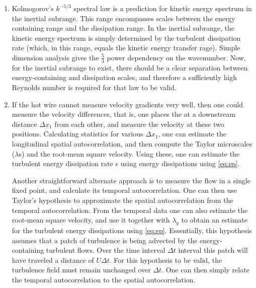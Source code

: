 \documentclass[11pt]{article}
\begin{document}
\begin{enumerate}[label=(\alph*)]

        \item Kolmogorov's $k^{-5/3}$ spectral law is a prediction for kinetic energy spectrum in the inertial
             subrange. This range encompasses scales between the energy containing range and the 
              dissipation range. In the inertial subrange, the kinetic energy spectrum is simply determined by the
               turbulent dissipation rate (which, in this range, equals the kinetic energy transfer rage). Simple dimension analysis
                gives the $\tfrac{5}{3}$ power dependency on the wavenumber. Now, for the inertial subrange to exist, 
                 there should be a clear separation between energy-containing and dissipation scales, and therefore
                  a sufficiently high Reynolds number is required for that law to be valid.
              \item If the hot wire cannot measure velocity gradients very well, then one could measure the velocity differences, that is, one places the  at a downstream distance $\Delta x_1$  from each other, and measure the velocity at these two positions. Calculating statistics for various $\Delta x_1$, one can estimate the longitudinal spatial autocorrelation, and then compute the Taylor microscales ($\lambda$s) and the root-mean square velocity. Using these, one can estimate the turbulent energy dissipation rate $\epsilon$ using energy dissipations using \ref{eq:ep}.
                  
                  Another straightforward alternate approach is to measure the flow in a single fixed point, and calculate its temporal autocorrelation. One can then use Taylor's hypothesis to approximate the spatial autocorrelation from the temporal autocorrelation. From the temporal data one can also estimate the root-mean square velocity, and use it together with $\lambda_g$ to obtain an estimate for the turbulent energy dissipations using \ref{eq:ep}. Essentially, this hypothesis assumes that a patch of turbulence is being advected by the energy-containing turbulent flows. Over the time interval $\Delta t$ interval this patch will have traveled a distance of $U \Delta t$. For this hypothesis to be valid, the turbulence field must remain unchanged over $\Delta t$. One can then simply relate the temporal autocorrelation to the spatial autocorrelation.


\end{enumerate}
\end{document}
